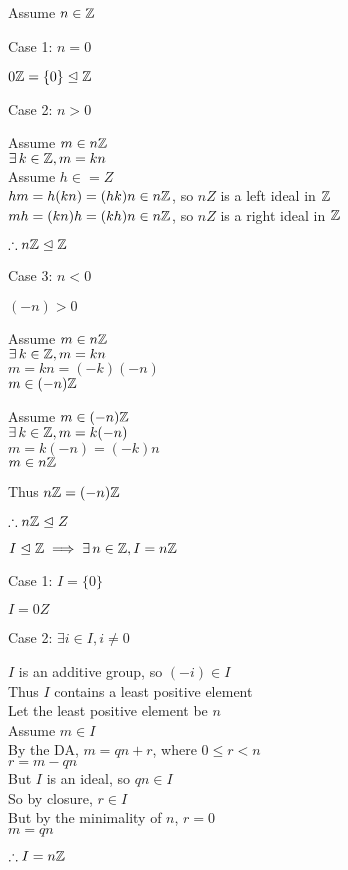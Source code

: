 \documentclass[letterpaper,12pt,fleqn]{article}
\newcommand{\ide}{\trianglelefteq}
\begin{document}
\begin{theproof}
  Assume $n\in\mathbb{Z}$
  
  \begin{description}
  \item Case 1: $n=0$
    
    $0\Z=\{0\}\ide\Z$

  \item Case 2: $n>0$

    Assume $m\in n\mathbb{Z}$ \\
    $\exists\,k\in\mathbb{Z},m=kn$ \\
    Assume $h\in=Z$ \\
    $hm=h(kn)=(hk)n\in n\mathbb{Z}$, so $nZ$ is a left ideal in $\mathbb{Z}$ \\
    $mh=(kn)h=(kh)n\in n\mathbb{Z}$, so $nZ$ is a right ideal in $\mathbb{Z}$

    $\therefore n\Z\ide\Z$
\newpage
  \item Case 3: $n<0$

    $(-n)>0$

    Assume $m\in n\mathbb{Z}$ \\
    $\exists\,k\in\mathbb{Z},m=kn$ \\
    $m=kn=(-k)(-n)$ \\
    $m\in (-n)\mathbb{Z}$

    Assume $m\in(-n)\mathbb{Z}$ \\
    $\exists\,k\in\mathbb{Z},m=k(-n)$ \\
    $m=k(-n)=(-k)n$ \\
    $m\in n\mathbb{Z}$

    Thus $n\mathbb{Z}=(-n)\mathbb{Z}$

    $\therefore n\Z\ide Z$
  \end{description}
\end{theproof}

\begin{theorem}
  $I\ide\Z\implies\exists\,n\in\Z,I=n\Z$
\end{theorem}

\begin{theproof}
  \listbreak
  \begin{description}
  \item Case 1: $I=\{0\}$

    $I=0Z$

  \item Case 2: $\exists i\in I,i\ne0$

    $I$ is an additive group, so $(-i)\in I$ \\
    Thus $I$ contains a least positive element \\
    Let the least positive element be $n$ \\
    Assume $m\in I$ \\
    By the DA, $m=qn+r$, where $0\le r<n$ \\
    $r=m-qn$ \\
    But $I$ is an ideal, so $qn\in I$ \\
    So by closure, $r\in I$ \\
    But by the minimality of $n$, $r=0$ \\
    $m=qn$

    $\therefore I=n\mathbb{Z}$

  \end{description}
\end{theproof}
\end{document}
